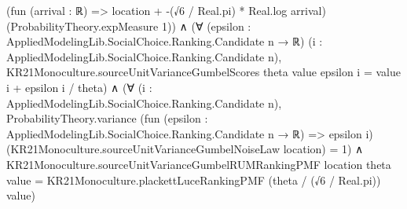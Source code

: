 \documentclass[10pt]{article}
\begin{document}
\begin{ReviewVerbatim}
                              (fun (arrival : ℝ) => location + -(√6 / Real.pi) * Real.log arrival)
                              (ProbabilityTheory.expMeasure 1)) ∧
                        (∀ (epsilon : AppliedModelingLib.SocialChoice.Ranking.Candidate n → ℝ)
                            (i : AppliedModelingLib.SocialChoice.Ranking.Candidate n),
                            KR21Monoculture.sourceUnitVarianceGumbelScores theta value epsilon i =
                              value i + epsilon i / theta) ∧
                          (∀ (i : AppliedModelingLib.SocialChoice.Ranking.Candidate n),
                              ProbabilityTheory.variance
                                  (fun (epsilon : AppliedModelingLib.SocialChoice.Ranking.Candidate n → ℝ) => epsilon i)
                                  (KR21Monoculture.sourceUnitVarianceGumbelNoiseLaw location) =
                                1) ∧
                            KR21Monoculture.sourceUnitVarianceGumbelRUMRankingPMF location theta value =
                              KR21Monoculture.plackettLuceRankingPMF (theta / (√6 / Real.pi)) value)
\end{ReviewVerbatim}
\end{document}
